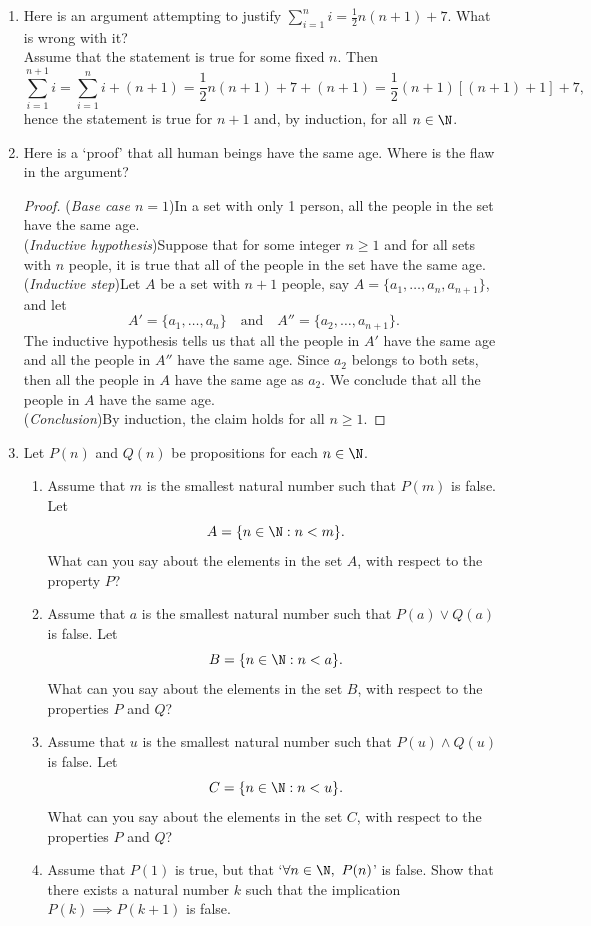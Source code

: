 \begin{enumerate}
  \item Here is an argument attempting to justify $\sum\limits_{i=1}^ni=\frac 12n(n+1)+7$. What is wrong with it?\\[5pt]
	Assume that the statement is true for some fixed $n$. Then
	\[\sum_{i=1}^{n+1}i=\sum_{i=1}^ni+(n+1)=\frac 12n(n+1)+7+(n+1)=\frac 12(n+1)[(n+1)+1]+7,\]
	hence the statement is true for $n+1$ and, by induction, for all $n\in\N$.\pagebreak[4]
	
	\item Here is a `proof' that all human beings have the same age. Where is the flaw in the argument?
	\begin{proof}
	(\emph{Base case $n=1$})\quad In a set with only 1 person, all the people in the set have the same age.\\[2pt]
	(\emph{Inductive hypothesis})\quad Suppose that for some integer $n\ge 1$ and for all sets with $n$ people, it is true that all of the people in the set have the same age.\\[2pt]
	(\emph{Inductive step})\quad Let $A$ be a set with $n+1$ people, say $A=\{a_1,\dots,a_n,a_{n+1}\}$, and let
		\[A'=\{a_1,\dots,a_n\}\quad\text{and}\quad A''=\{a_2,\dots,a_{n+1}\}.\]
		The inductive hypothesis tells us that all the people in $A'$ have the same age and all the people in $A''$ have the same age. Since $a_2$ belongs to both sets, then all the people in $A$ have the same age as $a_2$. We conclude that all the people in $A$ have the same age.\\[2pt]
	(\emph{Conclusion})\quad By induction, the claim holds for all $n\ge 1$.
	\end{proof}
	
	\item Let $P(n)$ and $Q(n)$ be propositions for each $n\in\N$.
	\begin{enumerate}
		\item Assume that $m$ is the smallest natural number such that $P(m)$ is false. Let
		\[A=\{n\in\N:n<m\}.\]
		What can you say about the elements in the set $A$, with respect to the property $P$?
		\item Assume that $a$ is the smallest natural number such that $P(a)\vee Q(a)$ is false. Let
		\[B=\{n\in\N:n<a\}.\]
		What can you say about the elements in the set $B$, with respect to the properties $P$ and $Q$?
		\item Assume that $u$ is the smallest natural number such that $P(u)\wedge Q(u)$ is false. Let
		\[C=\{n\in\N:n<u\}.\]
		What can you say about the elements in the set $C$, with respect to the properties $P$ and $Q$?
		\item Assume that $P(1)$ is true, but that `$\forall n\in\N,\ P(n)$' is false. Show that there exists a natural number $k$ such that the implication $P(k)\implies P(k+1)$ is false.
	\end{enumerate}
	

\end{enumerate}
